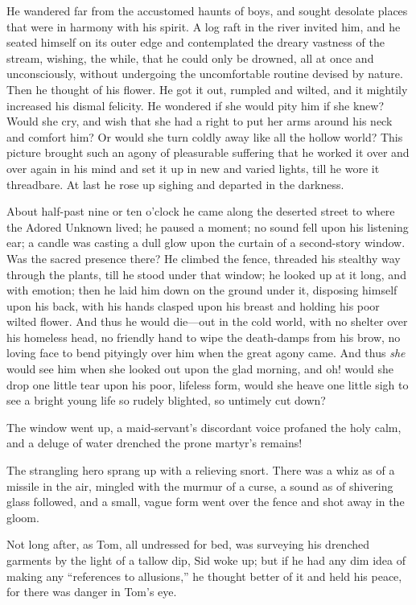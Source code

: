 \documentclass{book}
\begin{document}
He wandered far from the accustomed haunts of boys, and sought desolate places that were in harmony with his spirit. A log raft in the river invited him, and he seated himself on its outer edge and contemplated the dreary vastness of the stream, wishing, the while, that he could only be drowned, all at once and unconsciously, without undergoing the uncomfortable routine devised by nature. Then he thought of his flower. He got it out, rumpled and wilted, and it mightily increased his dismal felicity. He wondered if she would pity him if she knew? Would she cry, and wish that she had a right to put her arms around his neck and comfort him? Or would she turn coldly away like all the hollow world? This picture brought such an agony of pleasurable suffering that he worked it over and over again in his mind and set it up in new and varied lights, till he wore it threadbare. At last he rose up sighing and departed in the darkness.

About half-past nine or ten o’clock he came along the deserted street to where the Adored Unknown lived; he paused a moment; no sound fell upon his listening ear; a candle was casting a dull glow upon the curtain of a second-story window. Was the sacred presence there? He climbed the fence, threaded his stealthy way through the plants, till he stood under that window; he looked up at it long, and with emotion; then he laid him down on the ground under it, disposing himself upon his back, with his hands clasped upon his breast and holding his poor wilted flower. And thus he would die—out in the cold world, with no shelter over his homeless head, no friendly hand to wipe the death-damps from his brow, no loving face to bend pityingly over him when the great agony came. And thus \emph{she} would see him when she looked out upon the glad morning, and oh! would she drop one little tear upon his poor, lifeless form, would she heave one little sigh to see a bright young life so rudely blighted, so untimely cut down?

The window went up, a maid-servant’s discordant voice profaned the holy calm, and a deluge of water drenched the prone martyr’s remains!

The strangling hero sprang up with a relieving snort. There was a whiz as of a missile in the air, mingled with the murmur of a curse, a sound as of shivering glass followed, and a small, vague form went over the fence and shot away in the gloom.

Not long after, as Tom, all undressed for bed, was surveying his drenched garments by the light of a tallow dip, Sid woke up; but if he had any dim idea of making any “references to allusions,” he thought better of it and held his peace, for there was danger in Tom’s eye.
\end{document}
